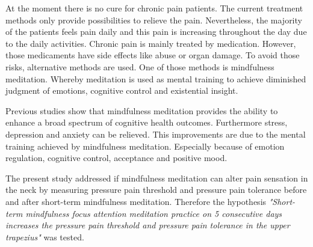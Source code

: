 At the moment there is no cure for chronic pain patients. The current treatment methods only provide possibilities to relieve the pain. \cite{marcus2009,pope2017} Nevertheless, the majority of the patients feels pain daily and this pain is increasing throughout the day due to the daily activities. \cite{Breivik2006}
Chronic pain is mainly treated by medication. However, those medicaments have side effects like abuse or organ damage. To avoid those risks, alternative methods are used. One of those methods is mindfulness meditation. Whereby meditation is used as mental training to achieve diminished judgment of emotions, cognitive control and existential insight. \cite{Zeidan2012}

Previous studies show that mindfulness meditation provides the ability to enhance a broad spectrum of cognitive health outcomes. Furthermore stress, depression and anxiety can be relieved. This improvements are due to the mental training achieved by mindfulness meditation. Especially because of emotion regulation, cognitive control, acceptance and positive mood. \cite{Zeidan2012,Zeidan2016} 


The present study addressed if mindfulness meditation can alter pain sensation in the neck by measuring pressure pain threshold and pressure pain tolerance before and after short-term mindfulness meditation. Therefore the hypothesis  \textit{"Short-term mindfulness focus attention meditation practice on 5 consecutive days increases the pressure pain threshold and pressure pain tolerance in the upper trapezius"} was tested.

